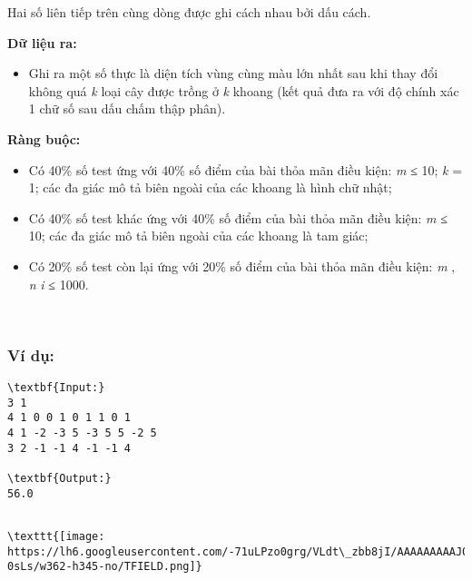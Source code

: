 Hai số liên tiếp trên cùng dòng được ghi cách nhau bởi dấu cách.

\textbf{Dữ liệu ra: }
\begin{itemize}
	\item Ghi ra một số thực là diện tích vùng cùng màu lớn nhất sau khi thay đổi không quá \emph{ k } loại cây được trồng ở \emph{ k } khoang (kết quả đưa ra với độ chính xác 1 chữ số sau dấu chấm thập phân).
\end{itemize}

\textbf{Ràng buộc: }
\begin{itemize}
	\item Có 40\% số test ứng với 40\% số điểm của bài thỏa mãn điều kiện: \emph{ m } ≤ 10; \emph{ k } = 1; các đa giác mô tả biên ngoài của các khoang là hình chữ nhật;
	\item Có 40\% số test khác ứng với 40\% số điểm của bài thỏa mãn điều kiện: \emph{ m } ≤ 10; các đa giác mô tả biên ngoài của các khoang là tam giác;
	\item Có 20\% số test còn lại ứng với 20\% số điểm của bài thỏa mãn điều kiện: \emph{ m } , \emph{ n }\emph{ i } ≤ 1000.
\end{itemize}

 

\subsubsection{Ví dụ:}
\begin{verbatim}
\textbf{Input:}
3 1
4 1 0 0 1 0 1 1 0 1
4 1 -2 -3 5 -3 5 5 -2 5
3 2 -1 -1 4 -1 -1 4

\textbf{Output:}
56.0\end{verbatim}
\begin{verbatim}

\texttt{[image: https://lh6.googleusercontent.com/-71uLPzo0grg/VLdt\_zbb8jI/AAAAAAAAAJ0/oLS4N1-0sLs/w362-h345-no/TFIELD.png]}\end{verbatim}
